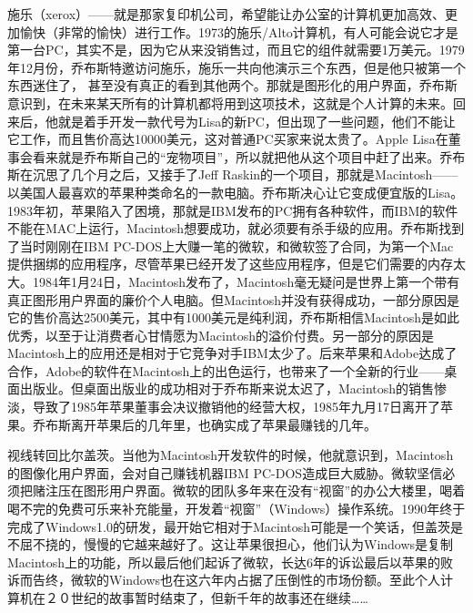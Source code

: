 \documentclass[a4paper]{ctexart}
\begin{document}
施乐（xerox）——就是那家复印机公司，希望能让办公室的计算机更加高效、更加愉快（非常的愉快）进行工作。1973的施乐/Alto计算机，有人可能会说它才是第一台PC，其实不是，因为它从来没销售过，而且它的组件就需要1万美元。1979年12月份，乔布斯特邀访问施乐，施乐一共向他演示三个东西，但是他只被第一个东西迷住了， 甚至没有真正的看到其他两个。那就是图形化的用户界面，乔布斯意识到，在未来某天所有的计算机都将用到这项技术，这就是个人计算的未来。回来后，他就是着手开发一款代号为Lisa的新PC，但出现了一些问题，他们不能让它工作，而且售价高达10000美元，这对普通PC买家来说太贵了。Apple Lisa在董事会看来就是乔布斯自己的“宠物项目”，所以就把他从这个项目中赶了出来。乔布斯在沉思了几个月之后，又接手了Jeff Raskin的一个项目，那就是Macintosh——以美国人最喜欢的苹果种类命名的一款电脑。乔布斯决心让它变成便宜版的Lisa。1983年初，苹果陷入了困境，那就是IBM发布的PC拥有各种软件，而IBM的软件不能在MAC上运行，Macintosh想要成功，就必须要有杀手级的应用。乔布斯找到了当时刚刚在IBM PC-DOS上大赚一笔的微软，和微软签了合同，为第一个Mac提供捆绑的应用程序，尽管苹果已经开发了这些应用程序，但是它们需要的内存太大。1984年1月24日，Macintosh发布了，Macintosh毫无疑问是世界上第一个带有真正图形用户界面的廉价个人电脑。但Macintosh并没有获得成功，一部分原因是它的售价高达2500美元，其中有1000美元是纯利润，乔布斯相信Macintosh是如此优秀，以至于让消费者心甘情愿为Macintosh的溢价付费。另一部分的原因是Macintosh上的应用还是相对于它竞争对手IBM太少了。后来苹果和Adobe达成了合作，Adobe的软件在Macintosh上的出色运行，也带来了一个全新的行业——桌面出版业。但桌面出版业的成功相对于乔布斯来说太迟了，Macintosh的销售惨淡，导致了1985年苹果董事会决议撤销他的经营大权，1985年九月17日离开了苹果。乔布斯离开苹果后的几年里，也确实成了苹果最赚钱的几年。

视线转回比尔盖茨。当他为Macintosh开发软件的时候，他就意识到，Macintosh的图像化用户界面，会对自己赚钱机器IBM PC-DOS造成巨大威胁。微软坚信必须把赌注压在图形用户界面。微软的团队多年来在没有“视窗”的办公大楼里，喝着喝不完的免费可乐来补充能量，开发着“视窗”（Windows）操作系统。1990年终于完成了Windows1.0的研发，最开始它相对于Macintosh可能是一个笑话，但盖茨是不屈不挠的，慢慢的它越来越好了。这让苹果很担心，他们认为Windows是复制Macintosh上的功能，所以最后他们起诉了微软，长达6年的诉讼最后以苹果的败诉而告终，微软的Windows也在这六年内占据了压倒性的市场份额。至此个人计算机在２０世纪的故事暂时结束了，但新千年的故事还在继续……
\end{document}
